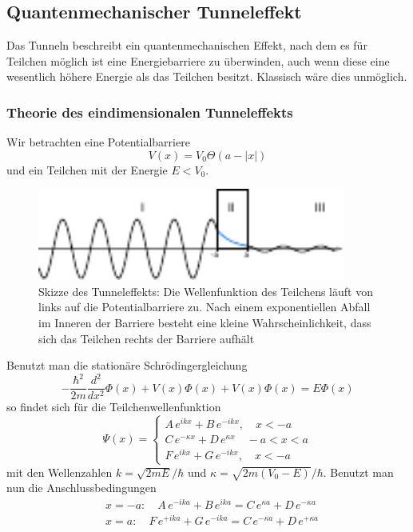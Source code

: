     \subsection{Quantenmechanischer Tunneleffekt}

Das Tunneln beschreibt ein quantenmechanischen Effekt, nach dem es für Teilchen
möglich ist eine Energiebarriere zu überwinden, auch wenn diese eine wesentlich
höhere Energie als das Teilchen besitzt. Klassisch wäre dies unmöglich.

        \subsubsection{Theorie des eindimensionalen Tunneleffekts}

Wir betrachten eine Potentialbarriere 
\[
    V(x) = V_0 \Theta ( a - |x| )    
\]
und ein Teilchen mit der Energie $E < V_0$.
\begin{figure}[h]
   \centering
   \includegraphics[width=0.9\textwidth]{Abb/tunnel.pdf}
   \caption{Skizze des Tunneleffekts: Die Wellenfunktion des Teilchens läuft von 
            links auf die Potentialbarriere zu. Nach einem exponentiellen Abfall
            im Inneren der Barriere besteht eine kleine Wahrscheinlichkeit, dass
            sich das Teilchen rechts der Barriere aufhält}
   \label{tunnel} 
\end{figure}
Benutzt man die stationäre Schrödingergleichung
\[
    - \frac{\hbar^2}{2m} \frac{d^2}{dx^2} \Phi(x) + V(x) \Phi(x) + V(x) \Phi(x)
    = E \Phi(x)    
\]
so findet sich für die Teilchenwellenfunktion
\[
    \Psi(x) = 
        \begin{cases}
            A \, e^{ikx} + B \, e^{-ikx}, \quad x<-a\\
            C \, e^{-\kappa x} + D \, e^{\kappa x} \quad -a < x < a\\
            F \, e^{ikx} + G \, e^{-ikx}, \quad x<-a
        \end{cases}
\]
mit den Wellenzahlen $k=\sqrt{2mE}/\hbar$ und $\kappa = \sqrt{2m(V_0-E)}/\hbar$.
Benutzt man nun die Anschlussbedingungen
\begin{align*}
    &x=-a: \quad A \, e^{-ika} + B \, e^{ika} = C \, e^{\kappa a} 
        + D \, e^{-\kappa a}\\
    &x=a: \quad F \, e^{+ika} + G \, e^{-ika} = C \, e^{-\kappa a} 
        + D \, e^{+\kappa a}
\end{align*}
